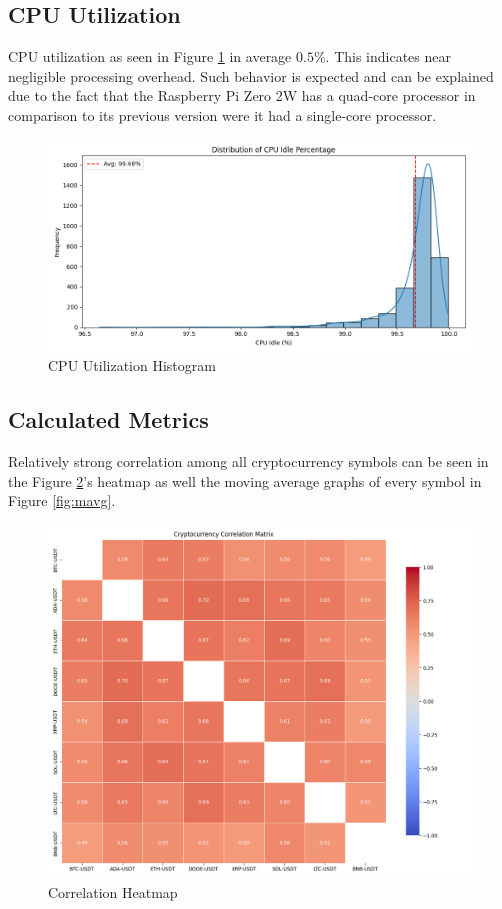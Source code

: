 \documentclass[12pt]{article}
\begin{document}
    \subsection{CPU Utilization}
        CPU utilization as seen in Figure \ref{fig:cpu_util} in average $0.5\%$. This indicates near negligible processing overhead. 
        Such behavior is expected and can be explained due to the fact that the Raspberry Pi Zero 2W has a quad-core processor in comparison 
        to its previous version were it had a single-core processor.
    
        \begin{figure}[!h]
            \centering
            \includegraphics[width=0.8\linewidth]{../results/cpu_idle_histogram.png}
            \caption{CPU Utilization Histogram}
            \label{fig:cpu_util}
        \end{figure}

    \newpage
    \subsection{Calculated Metrics}
        Relatively strong correlation among all cryptocurrency symbols can be seen in the Figure \ref{fig:corr}'s heatmap as well the 
        moving average graphs of every symbol in Figure \ref{fig:mavg}.
        
        \begin{figure}[!h]
            \centering
            \includegraphics[width=0.7\linewidth]{../results/correlation_heatmap.png}
            \caption{Correlation Heatmap}
            \label{fig:corr}
        \end{figure}
\end{document}

